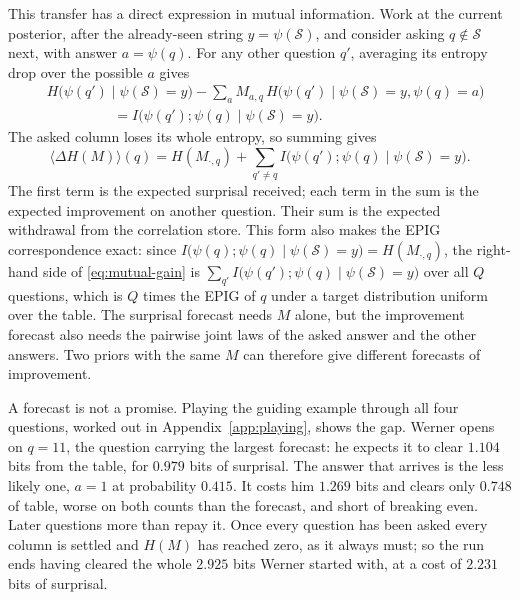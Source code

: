 \documentclass[11pt]{article}
\begin{document}
This transfer has a direct expression in mutual information. Work
at the current posterior, after the already-seen string
$y=\psi(\mathcal S)$, and consider asking $q\notin\mathcal S$ next,
with answer $a=\psi(q)$. For any other question $q'$, averaging its
entropy drop over the possible $a$ gives
\begin{equation}\label{eq:column-mutual-gain}
\begin{aligned}
 &H\big(\psi(q')\mid\psi(\mathcal S)=y\big)
 -\sum_a M_{a,q}\,
   H\big(\psi(q')\mid\psi(\mathcal S)=y,\psi(q)=a\big)\\
 &\hspace{2cm}=I\big(\psi(q');\psi(q)\mid\psi(\mathcal S)=y\big).
\end{aligned}
\end{equation}
The asked column loses its whole entropy, so summing gives
\begin{equation}\label{eq:mutual-gain}
  \langle\Delta H(M)\rangle(q)
  =H(M_{\cdot,q})+
   \sum_{q'\ne q}I\big(\psi(q');\psi(q)\mid\psi(\mathcal S)=y\big).
\end{equation}
The first term is the expected surprisal received; each term in the
sum is the expected improvement on another question. Their sum is
the expected withdrawal from the correlation store. This form also
makes the EPIG correspondence exact: since
$I\big(\psi(q);\psi(q) \mid \psi(\mathcal S) = y\big) = H(M_{\cdot,q})$,
the right-hand side of \eqref{eq:mutual-gain} is
$\sum_{q'} I\big(\psi(q');\psi(q) \mid \psi(\mathcal S) = y\big)$ over all
$Q$ questions, which is $Q$ times the EPIG of $q$ under a target
distribution uniform over the table. The surprisal
forecast needs $M$ alone, but the improvement forecast also needs
the pairwise joint laws of the asked answer and the other answers.
Two priors with the same $M$ can therefore give different forecasts
of improvement.

A forecast is not a promise. Playing the guiding example through all
four questions, worked out in Appendix~\ref{app:playing}, shows the
gap. Werner opens on $q = 11$, the question carrying the largest
forecast: he expects it to clear $1.104$ bits from the table, for
$0.979$ bits of surprisal. The answer that arrives is the less likely
one, $a = 1$ at probability $0.415$. It costs him $1.269$ bits and
clears only $0.748$ of table, worse on both counts than the forecast,
and short of breaking even. Later questions more than repay it.
Once every question has been asked every column is settled and $H(M)$
has reached zero, as it always must; so the run ends having cleared
the whole $2.925$ bits Werner started with, at a cost of $2.231$ bits
of surprisal.
\end{document}
